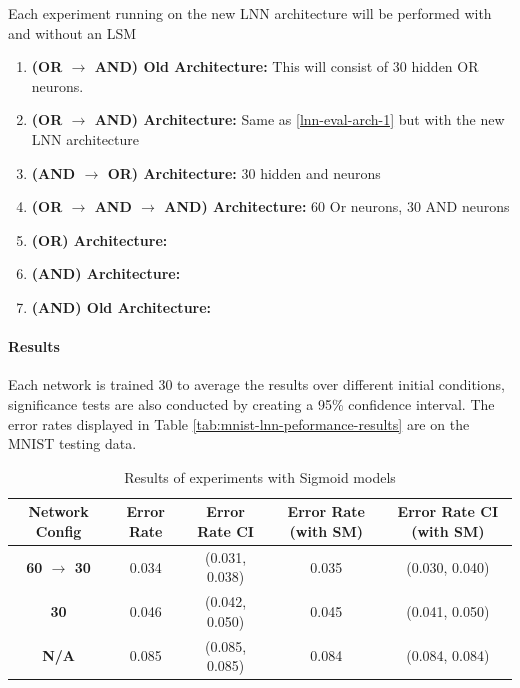 Each experiment running on the new LNN architecture will be performed with and without an LSM

\begin{enumerate}
	\item \textbf{(OR $\rightarrow$ AND) Old Architecture:} This will consist of 30 hidden OR neurons. \label{lnn-eval-arch-1}
	\item \textbf{(OR $\rightarrow$ AND) Architecture:} Same as \ref{lnn-eval-arch-1} but with the new LNN architecture \label{lnn-eval-arch-2}
	\item \textbf{(AND $\rightarrow$ OR) Architecture:} 30 hidden and neurons \label{lnn-eval-arch-3}
	\item \textbf{(OR $\rightarrow$ AND $\rightarrow$ AND) Architecture: } 60 Or neurons, 30 AND neurons\label{lnn-eval-arch-4}
	\item \textbf{(OR) Architecture:} \label{lnn-eval-arch-5}
	\item \textbf{(AND) Architecture:} \label{lnn-eval-arch-6}
	\item \textbf{(AND) Old Architecture:} \label{lnn-eval-arch-7}
\end{enumerate}

\paragraph{Results}
Each network is trained 30 to average the results over different initial conditions, significance tests are also conducted by creating a 95\% confidence interval. The error rates displayed in Table \ref{tab:mnist-lnn-peformance-results} are on the MNIST testing data.

\begin{table}[H]
	\begin{center}
		\begin{tabular}{| c | c | c | c | c |}
			\hline
			\textbf{Network Config} & \textbf{Error Rate} & \textbf{Error Rate CI} & \textbf{Error Rate (with SM)} & \textbf{Error Rate CI (with SM)}\\
			\hline
			\hline
			\textbf{60 $\rightarrow$ 30} & 0.034 & (0.031, 0.038) & 0.035 & (0.030, 0.040)\\
			\textbf{30} & 0.046 & (0.042, 0.050) & 0.045 & (0.041, 0.050)\\
			\textbf{N/A} & 0.085 & (0.085, 0.085) & 0.084 & (0.084, 0.084)\\
			\hline
		\end{tabular}
	\end{center}
	\caption{Results of experiments with Sigmoid models}
	\label{tab:mnist-sigmoid-peformance-results}
\end{table}

